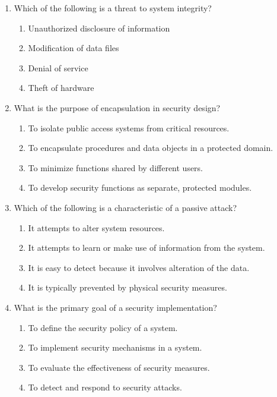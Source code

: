 \documentclass{article}
\begin{document}
\begin{enumerate}
    \item Which of the following is a threat to system integrity?
    \begin{enumerate}
        \item Unauthorized disclosure of information
        \item Modification of data files
        \item Denial of service
        \item Theft of hardware
    \end{enumerate}
  
    \item What is the purpose of encapsulation in security design?
    \begin{enumerate}
        \item To isolate public access systems from critical resources.
        \item To encapsulate procedures and data objects in a protected domain.
        \item To minimize functions shared by different users.
        \item To develop security functions as separate, protected modules.
    \end{enumerate}
    
    \item Which of the following is a characteristic of a passive attack?
    \begin{enumerate}
        \item It attempts to alter system resources.
        \item It attempts to learn or make use of information from the system.
        \item It is easy to detect because it involves alteration of the data.
        \item It is typically prevented by physical security measures.
    \end{enumerate}
    
    \item What is the primary goal of a security implementation?
    \begin{enumerate}
        \item To define the security policy of a system.
        \item To implement security mechanisms in a system.
        \item To evaluate the effectiveness of security measures.
        \item To detect and respond to security attacks.
    \end{enumerate}
    

\end{enumerate}
\end{document}

